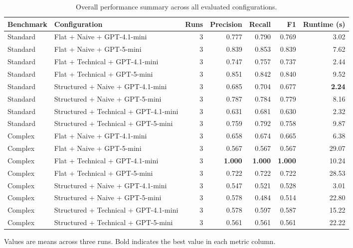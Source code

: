 \begin{table}[htbp]
\centering
\small
\caption{Overall performance summary across all evaluated configurations.}
\label{tab:overall-results-summary}
\begin{tabular}{llrrrrr}
\toprule
Benchmark & Configuration & Runs & Precision & Recall & F1 & Runtime (s) \\
\midrule
Standard & Flat + Naive + GPT-4.1-mini & 3 & 0.777 & 0.790 & 0.769 & 3.02 \\
Standard & Flat + Naive + GPT-5-mini & 3 & 0.839 & 0.853 & 0.839 & 7.62 \\
Standard & Flat + Technical + GPT-4.1-mini & 3 & 0.747 & 0.757 & 0.737 & 2.44 \\
Standard & Flat + Technical + GPT-5-mini & 3 & 0.851 & 0.842 & 0.840 & 9.52 \\
Standard & Structured + Naive + GPT-4.1-mini & 3 & 0.685 & 0.704 & 0.677 & \textbf{2.24} \\
Standard & Structured + Naive + GPT-5-mini & 3 & 0.787 & 0.784 & 0.779 & 8.16 \\
Standard & Structured + Technical + GPT-4.1-mini & 3 & 0.631 & 0.681 & 0.630 & 2.32 \\
Standard & Structured + Technical + GPT-5-mini & 3 & 0.759 & 0.792 & 0.758 & 9.87 \\
Complex & Flat + Naive + GPT-4.1-mini & 3 & 0.658 & 0.674 & 0.665 & 6.38 \\
Complex & Flat + Naive + GPT-5-mini & 3 & 0.567 & 0.567 & 0.567 & 29.07 \\
Complex & Flat + Technical + GPT-4.1-mini & 3 & \textbf{1.000} & \textbf{1.000} & \textbf{1.000} & 10.24 \\
Complex & Flat + Technical + GPT-5-mini & 3 & 0.722 & 0.722 & 0.722 & 28.53 \\
Complex & Structured + Naive + GPT-4.1-mini & 3 & 0.547 & 0.521 & 0.528 & 3.01 \\
Complex & Structured + Naive + GPT-5-mini & 3 & 0.578 & 0.484 & 0.514 & 22.80 \\
Complex & Structured + Technical + GPT-4.1-mini & 3 & 0.578 & 0.597 & 0.587 & 15.22 \\
Complex & Structured + Technical + GPT-5-mini & 3 & 0.561 & 0.561 & 0.561 & 22.22 \\
\bottomrule
\end{tabular}
\par\footnotesize{Values are means across three runs. Bold indicates the best value in each metric column.}
\end{table}
